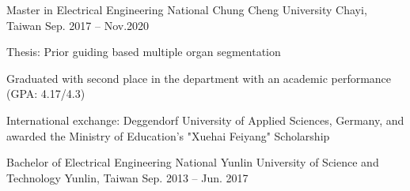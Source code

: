 

\begin{cventries}

  \cventry
    {Master in Electrical Engineering} %
    {National Chung Cheng University} %
    {Chayi, Taiwan} %
    {Sep. 2017 – Nov.2020} %
    {
    \begin{cvitems}
      \item Thesis: Prior guiding based multiple organ segmentation
      \item Graduated with second place in the department with an academic performance   (GPA: 4.17/4.3)
      \item International exchange: Deggendorf University of Applied Sciences, Germany, and awarded the Ministry of Education's "Xuehai Feiyang" Scholarship
    \end{cvitems}
    }
    
    
  \cventry
    {Bachelor of Electrical Engineering} %
    {National Yunlin University of Science and Technology} %
    {Yunlin, Taiwan} %
    {Sep. 2013 – Jun. 2017} %
    {}

\end{cventries}
